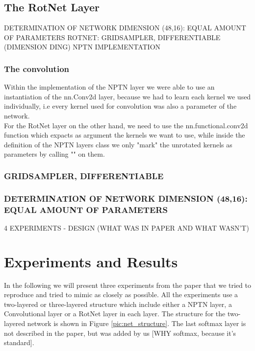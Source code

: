 \documentclass{llncs}
\begin{document}
\subsection{The RotNet Layer}
DETERMINATION OF NETWORK DIMENSION (48,16): EQUAL AMOUNT
OF PARAMETERS
ROTNET: GRIDSAMPLER, DIFFERENTIABLE
(DIMENSION DING)
NPTN IMPLEMENTATION

\subsubsection{The convolution}
Within the implementation of the NPTN layer we were able to use an instantiation of the nn.Conv2d layer, because we had to learn each kernel we used individually, i.e every kernel used for convolution was also a parameter of the network.\\
For the RotNet layer on the other hand, we need to use the nn.functional.conv2d function which expacts as argument the kernels we want to use, while inside the definition of the NPTN layers class we only "mark" the unrotated kernels as parameters by calling "" on them.

\subsubsection{GRIDSAMPLER, DIFFERENTIABLE}
\subsubsection{DETERMINATION OF NETWORK DIMENSION (48,16): EQUAL AMOUNT OF PARAMETERS}

4 EXPERIMENTS
- DESIGN (WHAT WAS IN PAPER AND WHAT WASN'T)



\section{Experiments and Results}	
In the following we will present three experiments from the paper that we tried to reproduce and tried to mimic as closely as possible. 
All the experiments use a two-layered or three-layered structure which include either a NPTN layer, a Convolutional layer or a RotNet layer in each layer. The structure for the two-layered network is shown in Figure \ref{pic:net_structure}. The last softmax layer is not described in the paper, but was added by us [WHY softmax, because it's standard]. 
\end{document}
